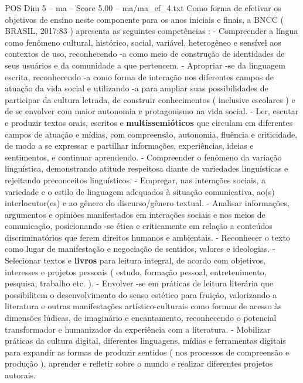 \begin{textsample}{POS Dim 5 – ma – Score 5.00 – ma/ma\_ef\_4.txt}
Como forma de efetivar os objetivos de ensino neste componente para os anos iniciais e finais, a BNCC ( BRASIL, 2017:83 ) apresenta as seguintes competências : - Compreender a língua como fenômeno cultural, histórico, social, variável, heterogêneo e sensível aos contextos de uso, reconhecendo -a como meio de construção de identidades de seus usuários e da comunidade a que pertencem. - Apropriar -se da linguagem escrita, reconhecendo -a como forma de interação nos diferentes campos de atuação da vida social e utilizando -a para ampliar suas possibilidades de participar da cultura letrada, de construir conhecimentos ( inclusive escolares ) e de se envolver com maior autonomia e protagonismo na vida social. - Ler, escutar e produzir textos orais, escritos e \textbf{multissemióticos} que circulam em diferentes campos de atuação e mídias, com compreensão, autonomia, fluência e criticidade, de modo a se expressar e partilhar informações, experiências, ideias e sentimentos, e continuar aprendendo. - Compreender o fenômeno da variação linguística, demonstrando atitude respeitosa diante de variedades linguísticas e rejeitando preconceitos linguísticos. - Empregar, nas interações sociais, a variedade e o estilo de linguagem adequados à situação comunicativa, ao(s) interlocutor(es) e ao gênero do discurso/gênero textual. - Analisar informações, argumentos e opiniões manifestados em interações sociais e nos meios de comunicação, posicionando -se ética e criticamente em relação a conteúdos discriminatórios que ferem direitos humanos e ambientais. - Reconhecer o texto como lugar de manifestação e negociação de sentidos, valores e ideologias. - Selecionar textos e \textbf{livros} para leitura integral, de acordo com objetivos, interesses e projetos pessoais ( estudo, formação pessoal, entretenimento, pesquisa, trabalho etc. ). - Envolver -se em práticas de leitura literária que possibilitem o desenvolvimento do senso estético para fruição, valorizando a literatura e outras manifestações artístico-culturais como formas de acesso às dimensões lúdicas, de imaginário e encantamento, reconhecendo o potencial transformador e humanizador da experiência com a literatura. - Mobilizar práticas da cultura digital, diferentes linguagens, mídias e ferramentas digitais para expandir as formas de produzir sentidos ( nos processos de compreensão e produção ), aprender e refletir sobre o mundo e realizar diferentes projetos autorais.

\end{textsample}
